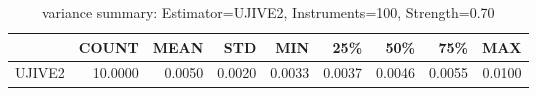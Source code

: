 \begin{table}[ht]
\centering
\caption{variance summary: Estimator=UJIVE2, Instruments=100, Strength=0.70}
\begin{tabular}{lrrrrrrrr}
\toprule
 & COUNT & MEAN & STD & MIN & 25\% & 50\% & 75\% & MAX \\
\midrule
UJIVE2 & 10.0000 & 0.0050 & 0.0020 & 0.0033 & 0.0037 & 0.0046 & 0.0055 & 0.0100 \\
\bottomrule
\end{tabular}
\end{table}
